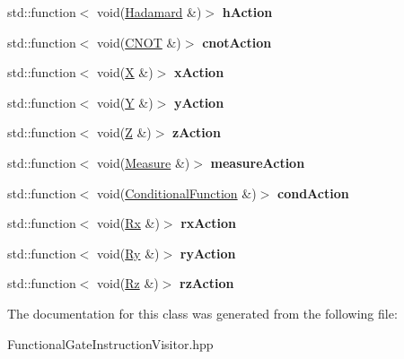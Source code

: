 \begin{DoxyCompactItemize}
\item 
std\+::function$<$ void(\hyperlink{a00137}{Hadamard} \&)$>$ {\bfseries h\+Action}\hypertarget{a00110_a02f1401c9b0d1da801027f3bc0b5227e}{}\label{a00110_a02f1401c9b0d1da801027f3bc0b5227e}

\item 
std\+::function$<$ void(\hyperlink{a00058}{C\+N\+OT} \&)$>$ {\bfseries cnot\+Action}\hypertarget{a00110_a4d6bd8c2fd1af775ed08946942f60a0b}{}\label{a00110_a4d6bd8c2fd1af775ed08946942f60a0b}

\item 
std\+::function$<$ void(\hyperlink{a00336}{X} \&)$>$ {\bfseries x\+Action}\hypertarget{a00110_a9e0295434a2224b776609b057147a9af}{}\label{a00110_a9e0295434a2224b776609b057147a9af}

\item 
std\+::function$<$ void(\hyperlink{a00342}{Y} \&)$>$ {\bfseries y\+Action}\hypertarget{a00110_ae78f91a5cc9a7006f6bb1acee1c00501}{}\label{a00110_ae78f91a5cc9a7006f6bb1acee1c00501}

\item 
std\+::function$<$ void(\hyperlink{a00343}{Z} \&)$>$ {\bfseries z\+Action}\hypertarget{a00110_ae197f358e3d0777feb3656455e2ee672}{}\label{a00110_ae197f358e3d0777feb3656455e2ee672}

\item 
std\+::function$<$ void(\hyperlink{a00215}{Measure} \&)$>$ {\bfseries measure\+Action}\hypertarget{a00110_a239748abedd67c7b30cad12e545d1926}{}\label{a00110_a239748abedd67c7b30cad12e545d1926}

\item 
std\+::function$<$ void(\hyperlink{a00060}{Conditional\+Function} \&)$>$ {\bfseries cond\+Action}\hypertarget{a00110_a5c0595a70b1f7ae50f3e29a985e249e9}{}\label{a00110_a5c0595a70b1f7ae50f3e29a985e249e9}

\item 
std\+::function$<$ void(\hyperlink{a00256}{Rx} \&)$>$ {\bfseries rx\+Action}\hypertarget{a00110_ab79bb3eb3050d1c599061863bb2e219e}{}\label{a00110_ab79bb3eb3050d1c599061863bb2e219e}

\item 
std\+::function$<$ void(\hyperlink{a00257}{Ry} \&)$>$ {\bfseries ry\+Action}\hypertarget{a00110_a229b7d9aae52638c6eff04bd16bb9973}{}\label{a00110_a229b7d9aae52638c6eff04bd16bb9973}

\item 
std\+::function$<$ void(\hyperlink{a00258}{Rz} \&)$>$ {\bfseries rz\+Action}\hypertarget{a00110_a586ab5721150c67ad3ced46e2a236b44}{}\label{a00110_a586ab5721150c67ad3ced46e2a236b44}

\end{DoxyCompactItemize}


The documentation for this class was generated from the following file\+:\begin{DoxyCompactItemize}
\item 
Functional\+Gate\+Instruction\+Visitor.\+hpp\end{DoxyCompactItemize}
